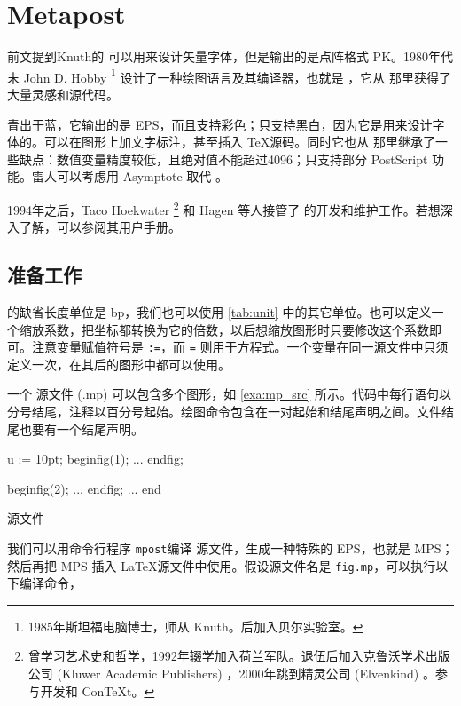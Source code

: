 \chapter{Metapost}
\label{sec:mp}

前文提到Knuth的 \MF 可以用来设计矢量字体，但是输出的是点阵格式 PK。1980年代末 John D. Hobby\indexHobby{} \footnote{1985年斯坦福电脑博士，师从 Knuth。后加入贝尔实验室。} 设计了一种绘图语言及其编译器，也就是 \MP ，它从 \MF 那里获得了大量灵感和源代码。

\MP 青出于蓝，它输出的是 EPS，而且支持彩色；\MF 只支持黑白，因为它是用来设计字体的。\MP 可以在图形上加文字标注，甚至插入 \TeX 源码。同时它也从 \MF 那里继承了一些缺点：数值变量精度较低，且绝对值不能超过4096；只支持部分 PostScript 功能。雷人可以考虑用 Asymptote 取代 \MP。

1994年之后，Taco Hoekwater\indexHoekwater{} \footnote{曾学习艺术史和哲学，1992年辍学加入荷兰军队。退伍后加入克鲁沃学术出版公司 (Kluwer Academic Publishers) ，2000年跳到精灵公司 (Elvenkind) 。参与开发\LuaTeX{}和 Con\TeX t。} 和 Hagen 等人接管了 \MP 的开发和维护工作。若想深入了解，可以参阅其用户手册\citep{Hobby_metapost}。

\section{准备工作}

\MP 的缺省长度单位是 bp，我们也可以使用 \autoref{tab:unit} 中的其它单位。也可以定义一个缩放系数，把坐标都转换为它的倍数，以后想缩放图形时只要修改这个系数即可。注意变量赋值符号是 \texttt{:=}，而 \texttt{=} 则用于方程式。一个变量在同一源文件中只须定义一次，在其后的图形中都可以使用。

一个 \MP 源文件 (.mp) 可以包含多个图形，如 \autoref{exa:mp_src} 所示。代码中每行语句以分号结尾，注释以百分号起始。绘图命令包含在一对起始和结尾声明之间。文件结尾也要有一个结尾声明。

\begin{example}[h]
\begin{Code}[numbers=left]
u := 10pt;   %
beginfig(1); %
...          %
endfig;      %

beginfig(2);
...
endfig;
...
end          %
\end{Code}
\caption{\MP 源文件}
\label{exa:mp_src}
\end{example}

我们可以用命令行程序 \texttt{mpost}编译 \MP 源文件，生成一种特殊的 EPS，也就是 MPS；然后再把 MPS 插入 \LaTeX 源文件中使用。假设源文件名是 \texttt{fig.mp}，可以执行以下编译命令，

